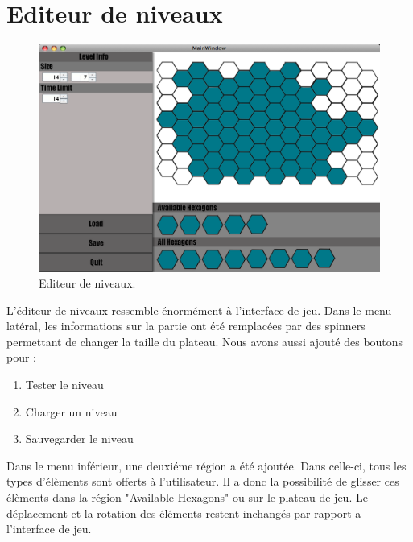 \documentclass[]{article}
\begin{document}
\section{Editeur de niveaux}\label{sec:editor}
\begin{figure}[!htb]
\begin{center}
  \includegraphics[width=\textwidth]{Editor.png}
  \caption{Editeur de niveaux.}\label{fig:editor}
\end{center}
\end{figure}

L'éditeur de niveaux ressemble énormément à l'interface de jeu. Dans le menu latéral, les informations sur la partie ont été remplacées par des spinners permettant de changer la taille du plateau. Nous avons aussi ajouté des boutons pour :
\begin{enumerate}
\item Tester le niveau
\item Charger un niveau
\item Sauvegarder le niveau
\end{enumerate}
Dans le menu inférieur, une deuxiéme région a été ajoutée. Dans celle-ci, tous les types d'élèments sont offerts à l'utilisateur. Il a donc la possibilité de glisser ces élèments dans la région "Available Hexagons" ou sur le plateau de jeu. Le déplacement et la rotation des éléments restent inchangés par rapport a l'interface de jeu.
\newpage
\end{document}
